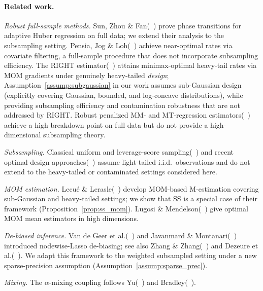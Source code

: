 \documentclass[10pt]{article}
\begin{document}
\paragraph{Related work.}
\emph{Robust full-sample methods.}
Sun, Zhou \& Fan(~\cite{sun2020adaptive}) prove phase transitions for adaptive
Huber regression on full data; we extend their analysis to the subsampling
setting.
Pensia, Jog \& Loh(~\cite{pensia2025robust}) achieve near-optimal rates via
covariate filtering, a full-sample procedure that does not incorporate subsampling
efficiency.
The RIGHT estimator(~\cite{fan2024right}) attains minimax-optimal heavy-tail rates
via MOM gradients under genuinely heavy-tailed \emph{design};
Assumption~\ref{assump:subgaussian} in our work assumes sub-Gaussian design
(explicitly covering Gaussian, bounded, and log-concave distributions), while
providing subsampling efficiency and contamination robustness that are not
addressed by RIGHT.
Robust penalized MM- and MT-regression estimators(~\cite{smucler2017robust,
kurnaz2023robust}) achieve a high breakdown point on full data but do not
provide a high-dimensional subsampling theory.

\emph{Subsampling.}
Classical uniform and leverage-score sampling(~\cite{ma2015statistical}) and
recent optimal-design approaches(~\cite{li2020modern,yao2021review,
chasiotis2024efficient}) assume light-tailed i.i.d.\ observations and do not
extend to the heavy-tailed or contaminated settings considered here.

\emph{MOM estimation.}
Lecu\'{e} \& Lerasle(~\cite{lecue2020robust}) develop MOM-based M-estimation
covering sub-Gaussian and heavy-tailed settings; we show that SS is a special
case of their framework (Proposition~\ref{prop:ss_mom}).
Lugosi \& Mendelson(~\cite{lugosi2019mean}) give optimal MOM mean estimators in
high dimensions.

\emph{De-biased inference.}
Van de Geer et al.(~\cite{vandegeer2014}) and Javanmard \&
Montanari(~\cite{javanmard2014}) introduced nodewise-Lasso de-biasing;
see also Zhang \& Zhang(~\cite{zhang2014confidence}) and
Dezeure et al.(~\cite{dezeure2015highdim}).
We adapt this framework to the weighted subsampled setting under a new
sparse-precision assumption (Assumption~\ref{assump:sparse_prec}).

\emph{Mixing.}
The $\alpha$-mixing coupling follows Yu(~\cite{yu1994rates}) and
Bradley(~\cite{bradley2005basic}).
\end{document}
